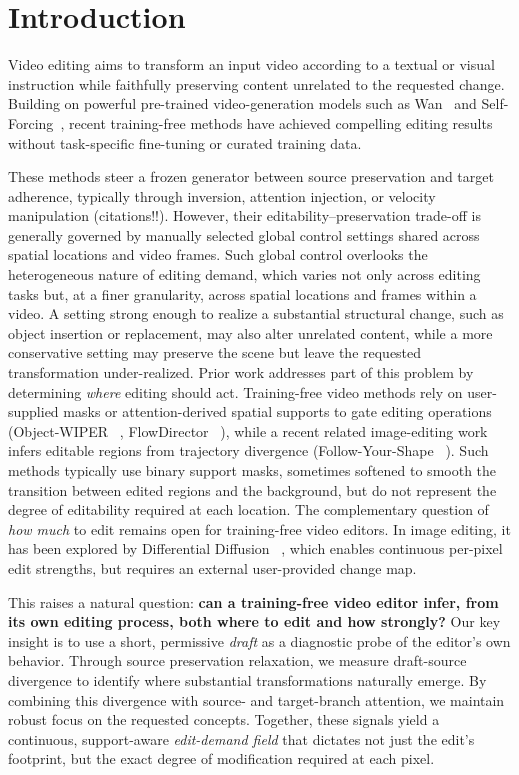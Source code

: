 \section{Introduction}
\label{sec:intro}

Video editing aims to transform an input video according to a textual or visual instruction while faithfully preserving content unrelated to the requested change. Building on powerful pre-trained video-generation models such as Wan~\cite{wan2025} and Self-Forcing~\cite{selfforcing2025}, recent training-free methods have achieved compelling editing results without task-specific fine-tuning or curated training data.


These methods steer a frozen generator between source preservation and target adherence, typically through inversion, attention injection, or velocity manipulation (citations!!). However, their editability–preservation trade-off is generally governed by manually selected global control settings shared across spatial locations and video frames. Such global control overlooks the heterogeneous nature of editing demand, which varies not only across editing tasks but, at a finer granularity, across spatial locations and frames within a video. A setting strong enough to realize a substantial structural change, such as object insertion or replacement, may also alter unrelated content, while a more conservative setting may preserve the scene but leave the requested transformation under-realized.
Prior work addresses part of this problem by determining \emph{where} editing should act. Training-free video methods rely on user-supplied masks or attention-derived spatial supports to gate editing operations (Object-WIPER ~\cite{objwiper}, FlowDirector ~\cite{flowdirector}), while a recent related image-editing work infers editable regions from trajectory divergence (Follow-Your-Shape ~\cite{fys}). Such methods typically use binary support masks, sometimes softened to smooth the transition between edited regions and the background, but do not represent the degree of editability required at each location. The complementary question of \emph{how much} to edit remains open for training-free video editors. In image editing, it has been explored by Differential Diffusion ~\cite{diffdiff}, which enables continuous per-pixel edit strengths, but requires an external user-provided change map. 


This raises a natural question: \textbf{can a training-free video editor infer, from its own editing process, both where to edit and how strongly?} Our key insight is to use a short, permissive \emph{draft} as a diagnostic probe of the editor's own behavior. Through source preservation relaxation, we measure draft-source divergence to identify where substantial transformations naturally emerge. By combining this divergence with source- and target-branch attention, we maintain robust focus on the requested concepts. Together, these signals yield a continuous, support-aware \emph{edit-demand field} that dictates not just the edit's footprint, but the exact degree of modification required at each pixel.

